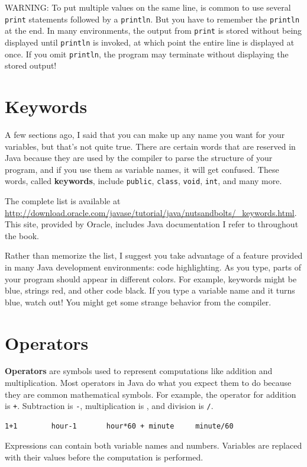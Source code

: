 \documentclass[12pt]{book}
\theoremstyle{exercise}
\begin{document}
WARNING: To put multiple values
on the same line, is common to use several {\tt print} statements
followed by a {\tt println}.
But you have to remember
the {\tt println} at the end.  In many environments, the
output from {\tt print} is stored without being displayed until
{\tt println} is invoked, at which point the entire
line is displayed at once.  If you omit {\tt println}, the
program may terminate without displaying the stored output!


\section{Keywords}

A few sections ago, I said that you can make up any name you
want for your variables, but that's not quite true.  There
are certain words that are reserved in Java because they are
used by the compiler to parse the structure of your program,
and if you use them as variable names, it will get confused.
These words, called {\bf keywords}, include {\tt public},
{\tt class}, {\tt void}, {\tt int}, and many more.

The complete list is available at \url{http://download.oracle.com/javase/tutorial/java/nutsandbolts/_keywords.html}.
This site, provided by Oracle, includes Java documentation I refer to
throughout the book.

Rather than memorize the list, I suggest you
take advantage of a feature provided in many Java development
environments: code highlighting.  As you type,
parts of your program should appear in different colors.  For
example, keywords might be blue, strings red, and other code
black.  If you type a variable name and it turns blue, watch
out!  You might get some strange behavior from the compiler.


\section{Operators}

{\bf Operators} are symbols used to represent
computations like addition and multiplication.  Most
operators in Java do what you expect them
to do because they are common mathematical symbols.  For
example, the operator for addition is {\tt +}.  Subtraction
is {\tt -}, multiplication is {\tt *}, and division is {\tt /}.

\begin{lstlisting}
1+1        hour-1       hour*60 + minute     minute/60
\end{lstlisting}
%
Expressions can contain both variable
names and numbers.  Variables are
replaced with their values before the computation is performed.
\end{document}
